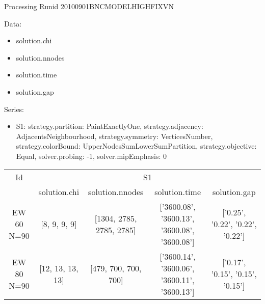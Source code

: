 \documentclass[landscape, 12pt]{report}
\begin{document}
 
 
 
 
 
	
	
	Processing Runid 20100901BNCMODELHIGHFIXVN
 
Data:
\begin{itemize}
\item solution.chi
\item solution.nnodes
\item solution.time
\item solution.gap
\end{itemize}
Series:
\begin{itemize}
\item S1: strategy.partition: PaintExactlyOne, strategy.adjacency: AdjacentsNeighbourhood, strategy.symmetry: VerticesNumber, strategy.colorBound: UpperNodesSumLowerSumPartition, strategy.objective: Equal, solver.probing: -1, solver.mipEmphasis: 0
\end{itemize}
\begin{tabular}{|c|cccc|}
\hline
\multicolumn{1}{|c|}{Id} & \multicolumn{4}{|c|}{S1}
\\
 & solution.chi & solution.nnodes & solution.time & solution.gap
\\
\hline
EW 60 N=90 & [8, 9, 9, 9] & [1304, 2785, 2785, 2785] & ['3600.08', '3600.13', '3600.08', '3600.08'] & ['0.25', '0.22', '0.22', '0.22']
\\
EW 80 N=90 & [12, 13, 13, 13] & [479, 700, 700, 700] & ['3600.14', '3600.06', '3600.11', '3600.13'] & ['0.17', '0.15', '0.15', '0.15']
\\
\hline 
 \end{tabular}

	
\end{document}
